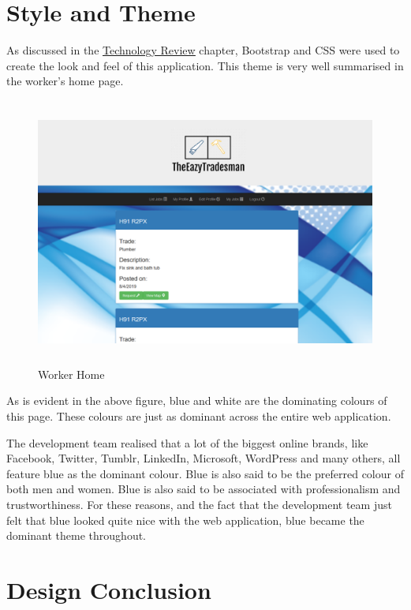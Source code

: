 \section{Style and Theme}
\label{sec:SystemDesignStyleandTheme}
As discussed in the  \hyperref[sec:TechnologyReview]{\underline{Technology Review}} chapter, Bootstrap and CSS were used to create the look and feel of this application. This theme is very well summarised in the worker's home page.

\begin{figure}[H]
    \centering
    \includegraphics[width=\textwidth, height=250pt]{img/HomeWorker.PNG}
    \caption{Worker Home}
    \label{fig:my_label}
\end{figure}

As is evident in the above figure, blue and white are the dominating colours of this page. These colours are just as dominant across the entire web application.

The development team realised that a lot of the biggest online brands, like Facebook, Twitter, Tumblr, LinkedIn, Microsoft, WordPress and many others, all feature blue as the dominant colour. Blue is also said to be the preferred colour of both men and women. Blue is also said to be associated with professionalism and trustworthiness\cite{Blue}. For these reasons, and the fact that the development team just felt that blue looked quite nice with the web application, blue became the dominant theme throughout. 

\section{Design Conclusion}
\label{sec:SystemDesignConclusion}


